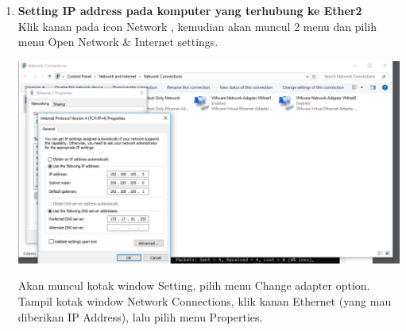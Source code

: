 \documentclass[a4paper,12pt]{article}
\begin{document}
\begin{enumerate}
	\item\textbf{Setting IP address pada komputer yang terhubung ke Ether2}\\
	Klik kanan pada icon Network , kemudian akan muncul 2 menu dan pilih menu
	Open Network \& Internet settings.
	\begin{center}
		\includegraphics[scale=.5]{Capture8}
	\end{center}
	Akan muncul kotak window Setting, pilih menu Change adapter option.
	Tampil kotak window Network Connections, klik kanan Ethernet (yang mau diberikan IP Address), lalu pilih menu Properties.
	
	
\end{enumerate}
\end{document}
